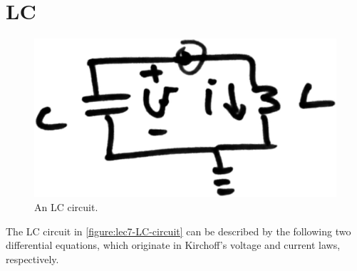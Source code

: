 \section{LC}
\begin{figure}
  \centering
  \includegraphics[width=0.4\linewidth]{figures/7/LC-circuit}
  \caption{An LC circuit.}
  \label{figure:lec7-LC-circuit}
\end{figure}
The LC circuit in \autoref{figure:lec7-LC-circuit} can be described by the following two differential equations, which originate in Kirchoff's voltage and current laws, respectively.
